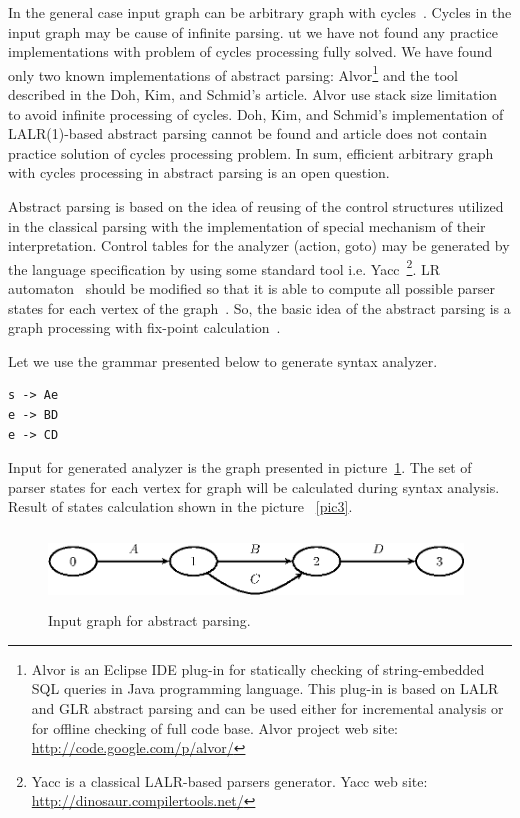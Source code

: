 In the general case input graph can be arbitrary graph with cycles~\cite{AbstrParsing}. Cycles in the input graph may 
be cause of infinite parsing. ut we have not found any practice implementations with problem of cycles processing fully 
solved. We have found only two known implementations of abstract parsing: Alvor\footnote{Alvor is an Eclipse IDE plug-in 
for statically checking of string-embedded SQL queries in Java programming language. This plug-in is based on LALR and GLR 
abstract parsing and can be used either for incremental analysis or for offline checking of full code base. Alvor project 
web site: \href{http://code.google.com/p/alvor/}{http://code.google.com/p/alvor/}} and the tool described in the Doh, Kim, 
and Schmid's article. Alvor use stack size limitation to avoid infinite processing of cycles. Doh, Kim, and Schmid's 
implementation of LALR(1)-based abstract parsing cannot be found and article does not contain practice solution of 
cycles processing problem. In sum, efficient arbitrary graph with cycles processing in abstract parsing is an open question.
	
Abstract parsing is based on the idea of reusing of the control structures utilized in the classical parsing with the 
implementation of special mechanism of their interpretation. Control tables for the analyzer (action, goto) may be generated by
 the language specification by using some standard tool i.e. Yacc~\footnote{Yacc is a classical LALR-based parsers generator. 
Yacc web site: \href{http://dinosaur.compilertools.net/}{http://dinosaur.compilertools.net/}}. LR automaton~\cite{Grune} should
 be modified so that it is able to compute all possible parser states for each vertex of the graph~\cite{AbstrParsing}. 
So, the basic idea of the abstract parsing is a graph processing with fix-point calculation~\cite{ALVOR2}.

Let we use the grammar presented below to generate syntax analyzer.

\begin{verbatim}
s -> Ae
e -> BD
e -> CD
\end{verbatim}

Input for generated analyzer is the graph presented in picture~\ref{pic2}. The set of parser states for each vertex for 
graph will be calculated during syntax analysis. Result of states calculation shown in the picture ~\ref{pic3}.

\begin{figure}
    \begin{center}
        \includegraphics[width=11cm,height=2cm]{graphs/simple_grammar_inpt.eps}
        \caption{Input graph for abstract parsing.}
        \label{pic2}
    \end{center}
\end{figure}

